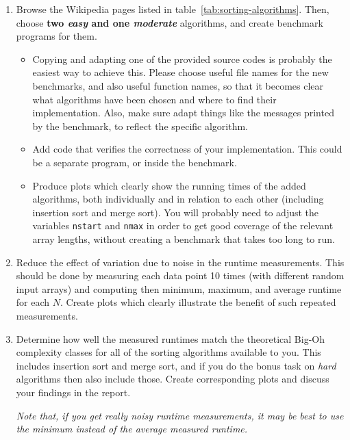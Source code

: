 \documentclass[a4paper,10pt]{article}
\begin{document}
\begin{enumerate}

\item
  Browse the Wikipedia pages listed in table~\ref{tab:sorting-algorithms}.
  Then, choose \textbf{two \emph{easy} and one \emph{moderate}} algorithms, and create benchmark programs for them.
  \begin{itemize}
  \item
    Copying and adapting one of the provided source codes is probably the easiest way to achieve this.
    Please choose useful file names for the new benchmarks, and also useful function names, so that it becomes clear what algorithms have been chosen and where to find their implementation.
    Also, make sure adapt things like the messages printed by the benchmark, to reflect the specific algorithm.
  \item
    Add code that verifies the correctness of your implementation.
    This could be a separate program, or inside the benchmark.
  \item
    Produce plots which clearly show the running times of the added algorithms, both individually and in relation to each other (including insertion sort and merge sort).
    You will probably need to adjust the variables \texttt{nstart} and \texttt{nmax} in order to get good coverage of the relevant array lengths, without creating a benchmark that takes too long to run.
  \end{itemize}

\item
  Reduce the effect of variation due to noise in the runtime measurements.
  This should be done by measuring each data point 10 times (with different random input arrays) and computing then minimum, maximum, and average runtime for each $N$.
  Create plots which clearly illustrate the benefit of such repeated measurements.
  
\item
  Determine how well the measured runtimes match the theoretical Big-Oh complexity classes for all of the sorting algorithms available to you.
  This includes insertion sort and merge sort, and if you do the bonus task on \emph{hard} algorithms then also include those.
  Create corresponding plots and discuss your findings in the report.
  
  \emph{Note that, if you get really noisy runtime measurements, it may be best to use the minimum instead of the average measured runtime.}
  
\end{enumerate}
\end{document}
